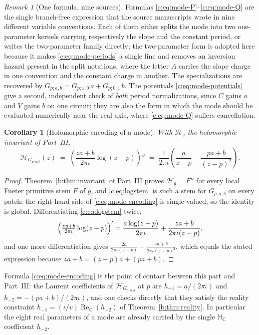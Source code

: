 \documentclass[11pt,a4paper]{article}
\numberwithin{equation}{section}
\newtheorem{corollary}[theorem]{Corollary}
\theoremstyle{definition}
\theoremstyle{remark}
\newtheorem{remark}[theorem]{Remark}
\theoremstyle{plain}
\newcommand{\HC}{\mathbb H_{\mathbb C}}
\newcommand{\CC}{\mathbb C}
\DeclareMathOperator{\Rea}{Re}
\newcommand{\ReC}{\Rea_{\CC}}
\newcommand{\pot}{C}          %
\newcommand{\potV}{V}         %
\newcommand{\Hg}{\mathcal H_{g}}      %
\begin{document}
\begin{remark}[One formula, nine sources]
Formulas \eqref{c:eq:mode-P}--\eqref{c:eq:mode-Q} are the single
branch-free expression that the source manuscripts wrote in nine
different variable conventions.  Each of them either splits the mode
into two one-parameter kernels carrying respectively the slope and the
constant period, or writes the two-parameter family directly; the
two-parameter form is adopted here because it makes
\eqref{c:eq:mode-periods} a single line and removes an inversion hazard
present in the split notations, where the letter $A$ carries the slope
charge in one convention and the constant charge in another.  The
specializations are recovered by
$G_{p;a,b}=G_{p;1,0}\,a+G_{p;0,1}\,b$.
The potentials \eqref{c:eq:mode-potentials} give a second, independent
check of \emph{both} period normalizations, since $\pot$ gains $a$ and
$\potV$ gains $b$ on one circuit; they are also the form in which the
mode should be evaluated numerically near the real axis, where
\eqref{c:eq:mode-Q} suffers cancellation.
\end{remark}

\begin{corollary}[Holomorphic encoding of a mode]
\label{c:cor:mode-encoding}
With $\Hg$ the holomorphic invariant of Part~III,
\begin{equation}
  \mathcal H_{G_{p;a,b}}(z)
  \;=\;\left(\frac{za+b}{2\pi\iota}\log(z-p)\right)''
  \;=\;\frac{1}{2\pi\iota}\left(\frac{a}{z-p}
        -\frac{pa+b}{(z-p)^{2}}\right).
  \label{c:eq:mode-encoding}
\end{equation}
\end{corollary}

\begin{proof}
Theorem~\ref{b:thm:invariant} of Part~III proves $\Hg=F''$ for every local Fueter primitive stem $F$ of $g$, and \eqref{c:eq:logstem} is such a stem for $G_{p;a,b}$ on every
patch; the right-hand side of \eqref{c:eq:mode-encoding} is single-valued,
so the identity is global.  Differentiating \eqref{c:eq:logstem} twice,
\[
  \Bigl(\tfrac{za+b}{2\pi\iota}\log(z-p)\Bigr)'
   =\frac{a\log(z-p)}{2\pi\iota}+\frac{za+b}{2\pi\iota(z-p)},
\]
and one more differentiation gives
$\frac{2a}{2\pi\iota(z-p)}-\frac{za+b}{2\pi\iota(z-p)^2}$, which equals
the stated expression because $za+b=(z-p)a+(pa+b)$.
\end{proof}

Formula \eqref{c:eq:mode-encoding} is the point of contact between this
part and Part~III: the Laurent coefficients of $\mathcal H_{G_{p;a,b}}$
at $p$ are $h_{-1}=a/(2\pi\iota)$ and $h_{-2}=-(pa+b)/(2\pi\iota)$, and
one checks directly that they satisfy the reality constraint
$h_{-1}=(\iota/v)\ReC(h_{-2})$ of Theorem~\ref{b:thm:reality}.  In particular the eight
real parameters of a mode are already carried by the single $\HC$
coefficient $h_{-2}$.
\end{document}
